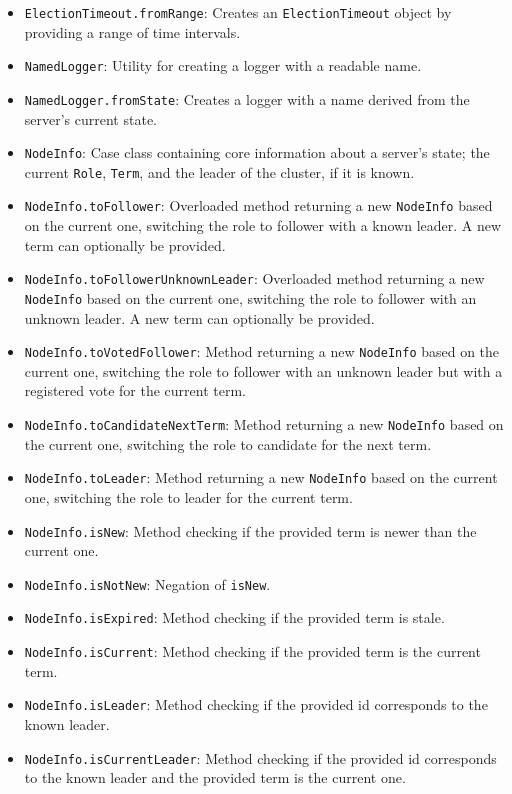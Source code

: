 \begin{itemize}
    \item \lstinline|ElectionTimeout.fromRange|: Creates an \lstinline|ElectionTimeout| object by providing a range of time intervals.
    \item \lstinline|NamedLogger|: Utility for creating a logger with a readable name.
    \item \lstinline|NamedLogger.fromState|: Creates a logger with a name derived from the server's current state.
    \item \lstinline|NodeInfo|: Case class containing core information about a server's state; the current \lstinline|Role|, \lstinline|Term|, and the leader of the cluster, if it is known.
    \item \lstinline|NodeInfo.toFollower|: Overloaded method returning a new \lstinline|NodeInfo| based on the current one, switching the role to follower with a known leader. A new term can optionally be provided.
    \item \lstinline|NodeInfo.toFollowerUnknownLeader|: Overloaded method returning a new \lstinline|NodeInfo| based on the current one, switching the role to follower with an unknown leader. A new term can optionally be provided.
    \item \lstinline|NodeInfo.toVotedFollower|: Method returning a new \lstinline|NodeInfo| based on the current one, switching the role to follower with an unknown leader but with a registered vote for the current term.
    \item \lstinline|NodeInfo.toCandidateNextTerm|: Method returning a new \lstinline|NodeInfo| based on the current one, switching the role to candidate for the next term.
    \item \lstinline|NodeInfo.toLeader|: Method returning a new \lstinline|NodeInfo| based on the current one, switching the role to leader for the current term.
    \item \lstinline|NodeInfo.isNew|: Method checking if the provided term is newer than the current one.
    \item \lstinline|NodeInfo.isNotNew|: Negation of \lstinline|isNew|.
    \item \lstinline|NodeInfo.isExpired|: Method checking if the provided term is stale.
    \item \lstinline|NodeInfo.isCurrent|: Method checking if the provided term is the current term.
    \item \lstinline|NodeInfo.isLeader|: Method checking if the provided id corresponds to the known leader.
    \item \lstinline|NodeInfo.isCurrentLeader|: Method checking if the provided id corresponds to the known leader and the provided term is the current one.

\end{itemize}
